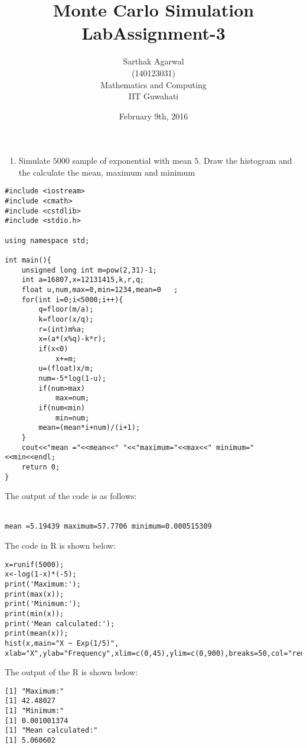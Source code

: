 \documentclass[12pt]{book}
\begin{document}
\title{\textbf{Monte Carlo Simulation Lab}}	
\title{\textbf{Assignment-3}}
\author{Sarthak Agarwal\\(140123031)\\Mathematics and Computing\\IIT Guwahati}
\date{February 9th, 2016}

\maketitle

\newpage
\begin{enumerate}
\item[Q 1] Simulate $5000$ sample of exponential with mean $5$. Draw the histogram and the calculate the mean, maximum and minimum
\end{enumerate}

\begin{lstlisting}
#include <iostream>
#include <cmath>
#include <cstdlib>
#include <stdio.h>

using namespace std;

int main(){
	unsigned long int m=pow(2,31)-1;
	int a=16807,x=12131415,k,r,q;
	float u,num,max=0,min=1234,mean=0	;
	for(int i=0;i<5000;i++){
		q=floor(m/a);
		k=floor(x/q);
		r=(int)m%a;
		x=(a*(x%q)-k*r);
		if(x<0)
			x+=m;
		u=(float)x/m;
		num=-5*log(1-u);
		if(num>max)
			max=num;
		if(num<min)
			min=num;
		mean=(mean*i+num)/(i+1);
	}
	cout<<"mean ="<<mean<<" "<<"maximum="<<max<<" minimum="<<min<<endl;
	return 0;
}
\end{lstlisting}
The output of the code is as follows:\\\\
\begin{lstlisting}
mean =5.19439 maximum=57.7706 minimum=0.000515309
\end{lstlisting}
\newpage
The code in R is shown below:\\
\begin{lstlisting}
x=runif(5000); 
x<-log(1-x)*(-5);
print('Maximum:');
print(max(x));
print('Minimum:');
print(min(x));
print('Mean calculated:');
print(mean(x));
hist(x,main="X ~ Exp(1/5)", xlab="X",ylab="Frequency",xlim=c(0,45),ylim=c(0,900),breaks=50,col="red");
\end{lstlisting}
The output of the R is shown below:\\
\begin{lstlisting}
[1] "Maximum:"
[1] 42.48027
[1] "Minimum:"
[1] 0.001001374
[1] "Mean calculated:"
[1] 5.060602
\end{lstlisting}
\end{document}
